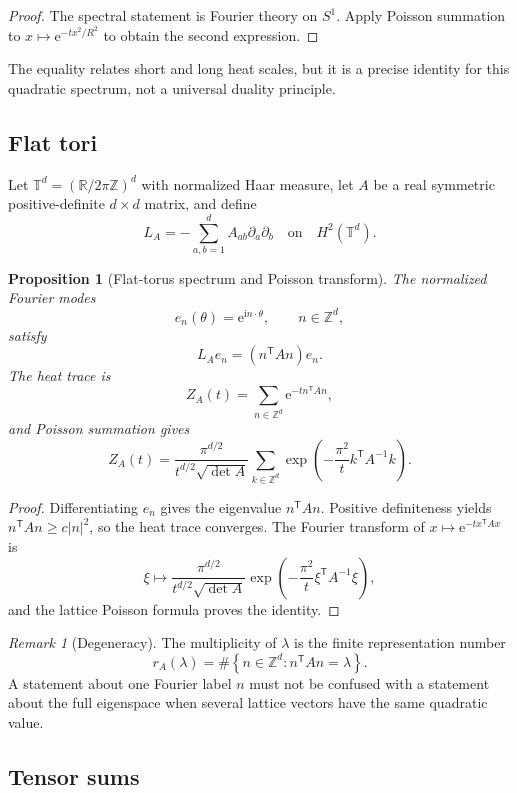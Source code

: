 \documentclass[11pt,a4paper]{article}
\newtheorem{proposition}[theorem]{Proposition}
\theoremstyle{definition}
\theoremstyle{remark}
\newtheorem{remark}[theorem]{Remark}
\newcommand{\R}{\mathbb R}
\newcommand{\Z}{\mathbb Z}
\newcommand{\T}{\mathbb T}
\newcommand{\e}{\mathrm e}
\newcommand{\ii}{\mathrm i}
\newcommand{\abs}[1]{\left\lvert #1\right\rvert}
\newcommand{\set}[1]{\left\{#1\right\}}
\begin{document}
\begin{proof}
The spectral statement is Fourier theory on \(S^1\). Apply Poisson summation to
\(x\mapsto\e^{-tx^2/R^2}\) to obtain the second expression.
\end{proof}

The equality relates short and long heat scales, but it is a precise identity for
this quadratic spectrum, not a universal duality principle.

\subsection{Flat tori}

Let \(\T^d=(\R/2\pi\Z)^d\) with normalized Haar measure, let \(A\) be a real
symmetric positive-definite \(d\times d\) matrix, and define
\[
 L_A=-\sum_{a,b=1}^d A_{ab}\partial_a\partial_b
 \quad\text{on}\quad H^2(\T^d).
\]

\begin{proposition}[Flat-torus spectrum and Poisson transform]
\label{prop:torus}
The normalized Fourier modes
\[
 e_n(\theta)=\e^{\ii n\cdot\theta},\qquad n\in\Z^d,
\]
satisfy
\[
 L_Ae_n=(n^{\mathsf T}An)e_n.
\]
The heat trace is
\[
 Z_A(t)=\sum_{n\in\Z^d}\e^{-t n^{\mathsf T}An},
\]
and Poisson summation gives
\[
 Z_A(t)=
 \frac{\pi^{d/2}}{t^{d/2}\sqrt{\det A}}
 \sum_{k\in\Z^d}
 \exp\left(-\frac{\pi^2}{t}k^{\mathsf T}A^{-1}k\right).
\]
\end{proposition}

\begin{proof}
Differentiating \(e_n\) gives the eigenvalue \(n^{\mathsf T}An\).
Positive definiteness yields \(n^{\mathsf T}An\geq c\abs n^2\), so the heat
trace converges. The Fourier transform of
\(x\mapsto\e^{-t x^{\mathsf T}Ax}\) is
\[
 \xi\longmapsto
 \frac{\pi^{d/2}}{t^{d/2}\sqrt{\det A}}
 \exp\left(-\frac{\pi^2}{t}\xi^{\mathsf T}A^{-1}\xi\right),
\]
and the lattice Poisson formula proves the identity.
\end{proof}

\begin{remark}[Degeneracy]
The multiplicity of \(\lambda\) is the finite representation number
\[
 r_A(\lambda)=
 \#\set{n\in\Z^d:n^{\mathsf T}An=\lambda}.
\]
A statement about one Fourier label \(n\) must not be confused with a statement
about the full eigenspace when several lattice vectors have the same quadratic
value.
\end{remark}

\subsection{Tensor sums}
\end{document}
